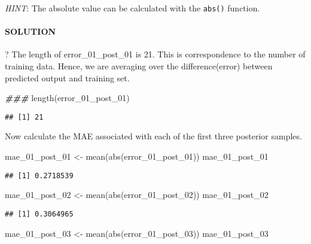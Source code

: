 \documentclass[
]{article}
\newenvironment{Shaded}{\begin{snugshade}}{\end{snugshade}}
\newcommand{\DocumentationTok}[1]{\textcolor[rgb]{0.56,0.35,0.01}{\textbf{\textit{#1}}}}
\newcommand{\FunctionTok}[1]{\textcolor[rgb]{0.00,0.00,0.00}{#1}}
\newcommand{\NormalTok}[1]{#1}
\newcommand{\OtherTok}[1]{\textcolor[rgb]{0.56,0.35,0.01}{#1}}
\begin{document}
\emph{HINT}: The absolute value can be calculated with the
\texttt{abs()} function.

\hypertarget{solution-8}{%
\paragraph{SOLUTION}\label{solution-8}}

? The length of error\_01\_post\_01 is 21. This is correspondence to the
number of training data. Hence, we are averaging over the
difference(error) between predicted output and training set.

\begin{Shaded}
\begin{Highlighting}[]
\DocumentationTok{\#\#\#}
\FunctionTok{length}\NormalTok{(error\_01\_post\_01)}
\end{Highlighting}
\end{Shaded}

\begin{verbatim}
## [1] 21
\end{verbatim}

Now calculate the MAE associated with each of the first three posterior
samples.

\begin{Shaded}
\begin{Highlighting}[]
\NormalTok{mae\_01\_post\_01 }\OtherTok{\textless{}{-}} \FunctionTok{mean}\NormalTok{(}\FunctionTok{abs}\NormalTok{(error\_01\_post\_01))}
\NormalTok{mae\_01\_post\_01}
\end{Highlighting}
\end{Shaded}

\begin{verbatim}
## [1] 0.2718539
\end{verbatim}

\begin{Shaded}
\begin{Highlighting}[]
\NormalTok{mae\_01\_post\_02 }\OtherTok{\textless{}{-}} \FunctionTok{mean}\NormalTok{(}\FunctionTok{abs}\NormalTok{(error\_01\_post\_02))}
\NormalTok{mae\_01\_post\_02}
\end{Highlighting}
\end{Shaded}

\begin{verbatim}
## [1] 0.3064965
\end{verbatim}

\begin{Shaded}
\begin{Highlighting}[]
\NormalTok{mae\_01\_post\_03 }\OtherTok{\textless{}{-}} \FunctionTok{mean}\NormalTok{(}\FunctionTok{abs}\NormalTok{(error\_01\_post\_03))}
\NormalTok{mae\_01\_post\_03}
\end{Highlighting}
\end{Shaded}
\end{document}
